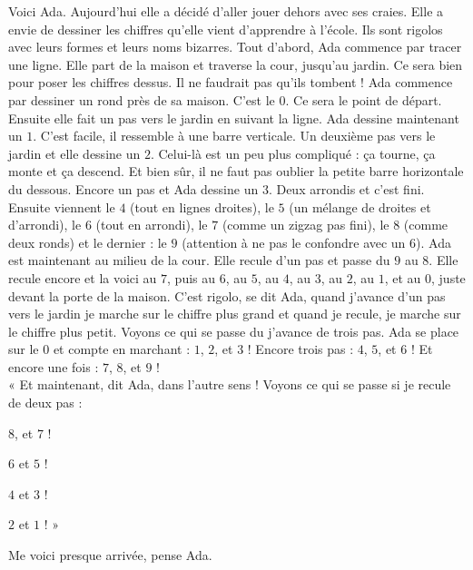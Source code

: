 Voici Ada. Aujourd'hui elle a décidé d'aller jouer dehors avec ses craies. 
Elle a envie de dessiner les chiffres qu'elle vient d'apprendre à l'école. Ils sont rigolos avec leurs formes et leurs noms bizarres.
Tout d'abord, Ada commence par tracer une ligne. Elle part de la maison et traverse la cour, jusqu'au jardin. 
Ce sera bien pour poser les chiffres dessus. Il ne faudrait pas qu'ils tombent ! 
Ada commence par dessiner un rond près de sa maison. C'est le $0$. Ce sera le point de départ. 
Ensuite elle fait un pas vers le jardin en suivant la ligne. Ada dessine maintenant un $1$. C'est facile, il ressemble à une barre verticale. 
Un deuxième pas vers le jardin et elle dessine un $2$. Celui-là est un peu plus compliqué : ça tourne, ça monte et ça descend. Et bien sûr, il ne faut pas oublier la petite barre horizontale du dessous.
Encore un pas et Ada dessine un $3$. Deux arrondis et c'est fini.
Ensuite viennent le $4$ (tout en lignes droites), le $5$ (un mélange de droites et d'arrondi), le $6$ (tout en arrondi), le $7$ (comme un zigzag pas fini), le $8$ (comme deux ronds) et le dernier : le $9$ (attention à ne pas le confondre avec un $6$). 
Ada est maintenant au milieu de la cour. Elle recule d'un pas et passe du $9$ au $8$. Elle recule encore et la voici au $7$, puis au $6$, au $5$, au $4$, au $3$, au $2$, au $1$, et au $0$, juste devant la porte de la maison. 
C'est rigolo, se dit Ada, quand j'avance d'un pas vers le jardin je marche sur le chiffre plus grand et quand je recule, je marche sur le chiffre plus petit. 
Voyons ce qui se passe du j'avance de trois pas. Ada se place sur le $0$ et compte en marchant : $1$, $2$, et $3$ ! Encore trois pas : $4$, $5$, et $6$ ! Et encore une fois : $7$, $8$, et $9$ ! \\
« Et maintenant, dit Ada, dans l'autre sens ! Voyons ce qui se passe si je recule de deux pas : 
\begin{description}
    \item $8$, et $7$ ! 
    \item $6$ et $5$ ! 
    \item $4$ et $3$ ! 
    \item $2$ et $1$ ! »
\end{description} 
Me voici presque arrivée, pense Ada.


%    
